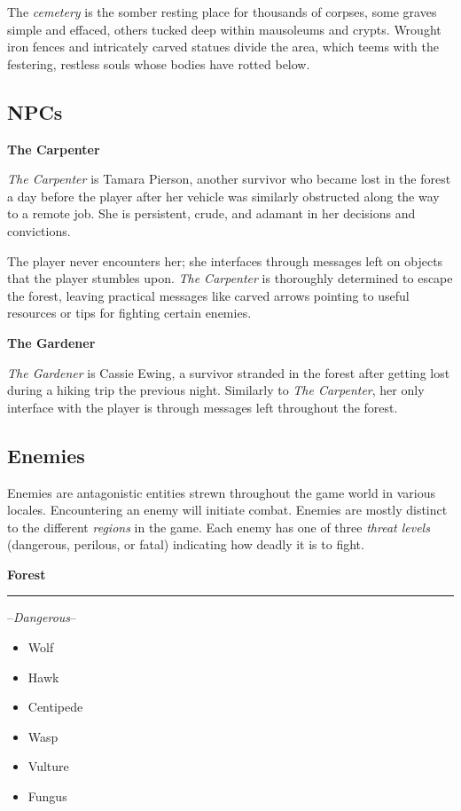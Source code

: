 \documentclass[11pt]{article}
\begin{document}
	The \textit{cemetery} is the somber resting place for thousands of corpses, some graves simple and effaced, others tucked deep within mausoleums and crypts. Wrought iron fences and intricately carved statues divide the area, which teems with the festering, restless souls whose bodies have rotted below.
	
	\subsection{NPCs}
	
	\textbf{The Carpenter}
	\newline
	
	\textit{The Carpenter} is Tamara Pierson, another survivor who became lost in the forest a day before the player after her vehicle was similarly obstructed along the way to a remote job. She is persistent, crude, and adamant in her decisions and convictions.
	
	The player never encounters her; she interfaces through messages left on objects that the player stumbles upon. \textit{The Carpenter} is thoroughly determined to escape the forest, leaving practical messages like carved arrows pointing to useful resources or tips for fighting certain enemies.
	
	\textbf{The Gardener}
	\newline
	
	\textit{The Gardener} is Cassie Ewing, a survivor stranded in the forest after getting lost during a hiking trip the previous night. Similarly to \textit{The Carpenter}, her only interface with the player is through messages left throughout the forest.
	
	\subsection{Enemies}
	
	Enemies are antagonistic entities strewn throughout the game world in various locales. Encountering an enemy will initiate combat. Enemies are mostly distinct to the different \textit{regions} in the game. Each enemy has one of three \textit{threat levels} (dangerous, perilous, or fatal) indicating how deadly it is to fight.\newline
	
	\textbf{Forest}
	\newline
	\rule{\textwidth}{0.4pt}
	
	--\textit{Dangerous}--
	\begin{itemize}
		\item Wolf
		\item Hawk
		\item Centipede
		\item Wasp
		\item Vulture
		\item Fungus
	\end{itemize}
\end{document}
